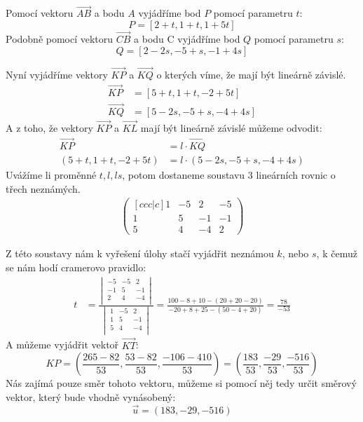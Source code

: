 \begin{example}
   Pomocí vektoru $\vec{AB}$ a bodu $A$ vyjádříme bod $P$ pomocí parametru $t$:
   $$P = [2 + t, 1 + t, 1 + 5t]$$
   Podobně pomocí vektoru $\vec{CB}$ a bodu C vyjádříme bod $Q$ pomocí parametru $s$:
   $$Q = [2 - 2s, -5 +s, -1 + 4s]$$

   Nyní vyjádříme vektory $\vec{KP}$ a $\vec{KQ}$ o kterých víme, že mají být lineárně závislé.
   \begin{align*}
       \vec{KP} &= [5 + t, 1 + t, -2 + 5t]\\
       \vec{KQ} &= [5 - 2s, -5 + s, -4 + 4s]
   \end{align*}
   A z toho, že vektory $\vec{KP}$ a $\vec{KL}$ mají být lineárně závislé můžeme odvodit:
   \begin{align*}
       \vec{KP} &= l \cdot \vec{KQ}\\
       (5 + t, 1 + t, -2 + 5t) &= l \cdot (5 -2s, -5 + s, -4 + 4s)
   \end{align*}
    Uvážíme li proměnné $t, l, ls$, potom dostaneme soustavu 3 lineárních rovnic o
    třech neznámých.
    \begin{align*}
    \begin{pmatrix}[ccc|c]
        1 & -5 & 2 & -5\\
        1 & 5 & -1 & -1\\
        5 & 4 & -4 & 2
    \end{pmatrix}
    \end{align*}

    Z této soustavy nám k vyřešení úlohy stačí vyjádřit neznámou $k$, nebo $s$,
    k čemuž se nám hodí cramerovo pravidlo:
    \begin{align*}
        t &= \frac{
            \begin{vmatrix}
                -5 & -5 & 2\\
                -1 & 5 & -1\\
                2 & 4 & -4\\
            \end{vmatrix}
        }{
            \begin{vmatrix}
                1 & -5 & 2\\
                1 & 5 & -1\\
                5 & 4 & -4\\
            \end{vmatrix}
        } = \frac{100 - 8 + 10 - (20 + 20 -20)}{-20 + 8 + 25 - (50 -4 + 20)} =
        \frac{78}{-53}
    \end{align*}
    A můžeme vyjádřit vektoř $\vec{KT}$:
    $$KP = (\frac{265 - 82}{53}, \frac{53 - 82}{53}, \frac{-106 - 410}{53}) =
    (\frac{183}{53}, \frac{-29}{53}, \frac{-516}{53})$$
    Nás zajímá pouze směr tohoto vektoru, můžeme si pomocí něj tedy určit směrový vektor,
    který bude vhodně vynásobený:
    $$\vec{u} = (183, -29, -516)$$
\end{example}

